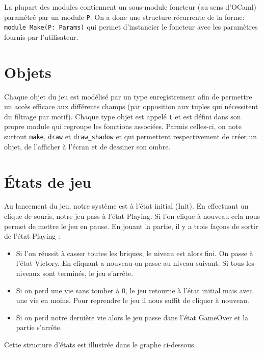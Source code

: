 \documentclass[french]{template}
\begin{document}
La plupart des modules contiennent un sous-module foncteur (au sens d'OCaml) paramétré par un module \texttt{P}. On a donc une structure récurrente de la forme: \texttt{module Make(P: Params)} qui permet d'instancier le foncteur avec les paramètres fournis par l'utilisateur.

\section{Objets}

Chaque objet du jeu est modélisé par un type enregistrement afin de permettre un accès efficace aux différents champs (par opposition aux tuples qui nécessitent du filtrage par motif). Chaque type objet est appelé \texttt{t} et est défini dans son propre module qui regroupe les fonctions associées. Parmis celles-ci, on note surtout \texttt{make}, \texttt{draw} et \texttt{draw\_shadow} et qui permettent respectivement de créer un objet, de l'afficher à l'écran et de dessiner son ombre.

\section{États de jeu}

Au lancement du jeu, notre système est à l'état initial (Init). En effectuant un clique de souris, notre jeu pass à l'état Playing. Si l'on clique à nouveau cela nous permet de mettre le jeu en pause. En jouant la partie, il y a trois façons de sortir de l'état Playing :

\begin{itemize}
    \item Si l'on réussit à casser toutes les briques, le niveau est alors fini. On passe à l'état Victory. En cliquant a nouveau on passe au niveau suivant. Si tous les niveaux sont terminés, le jeu s'arrête.
    \item Si on perd une vie sans tomber à 0, le jeu retourne à l'état initial mais avec une vie en moins. Pour reprendre le jeu il nous suffit de cliquer à nouveau.
    \item Si on perd notre dernière vie alors le jeu passe dans l'état GameOver et la partie s'arrête.
\end{itemize}

Cette structure d'états est illustrée dans le graphe ci-dessous.
\end{document}
